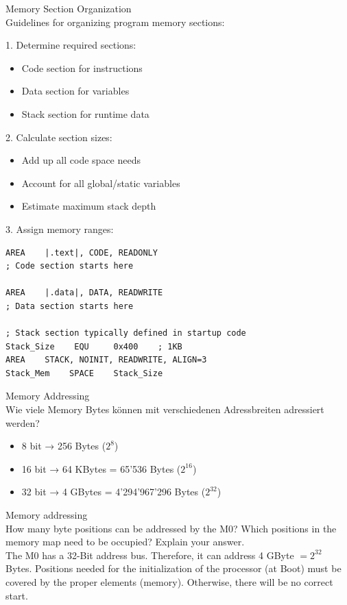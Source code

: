 \begin{KR}{Memory Section Organization}\\
Guidelines for organizing program memory sections:

1. Determine required sections:
\begin{itemize}
  \item Code section for instructions
  \item Data section for variables
  \item Stack section for runtime data
\end{itemize}

2. Calculate section sizes:
\begin{itemize}
  \item Add up all code space needs
  \item Account for all global/static variables
  \item Estimate maximum stack depth
\end{itemize}

3. Assign memory ranges:
\begin{lstlisting}[language=armasm, style=basesmol]
AREA    |.text|, CODE, READONLY
; Code section starts here

AREA    |.data|, DATA, READWRITE
; Data section starts here

; Stack section typically defined in startup code
Stack_Size    EQU     0x400    ; 1KB
AREA    STACK, NOINIT, READWRITE, ALIGN=3
Stack_Mem    SPACE    Stack_Size
\end{lstlisting}
\end{KR}




\begin{example2}{Memory Addressing}\\
Wie viele Memory Bytes können mit verschiedenen Adressbreiten adressiert werden?
\begin{itemize}
  \item 8 bit → 256 Bytes ($2^8$)
  \item 16 bit → 64 KBytes = 65'536 Bytes ($2^{16}$)
  \item 32 bit → 4 GBytes = 4'294'967'296 Bytes ($2^{32}$)
\end{itemize}
\end{example2}



\begin{example2}{Memory addressing}\\
How many byte positions can be addressed by the M0? Which positions in the memory map need to be occupied? Explain your answer.
\vspace{2mm}\\
The M0 has a 32-Bit address bus. Therefore, it can address 4 GByte $=2^{32}$ Bytes. Positions needed for the initialization of the processor (at Boot) must be covered by the proper elements (memory). Otherwise, there will be no correct start.\\
\end{example2}

